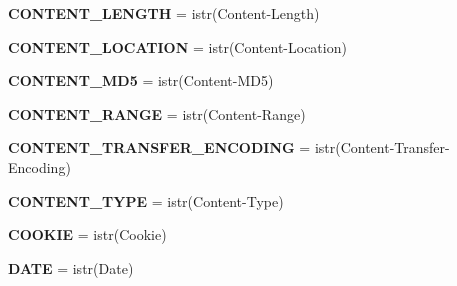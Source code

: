 \begin{DoxyCompactItemize}
\item 
\mbox{\label{namespaceaiohttp_1_1hdrs_a0021480f785966bab3a3574d0989e08b}} 
{\bfseries C\+O\+N\+T\+E\+N\+T\+\_\+\+L\+E\+N\+G\+TH} = istr(\textquotesingle{}Content-\/Length\textquotesingle{})
\item 
\mbox{\label{namespaceaiohttp_1_1hdrs_ac204b3a96d0adacc17ab5fe8728f4d96}} 
{\bfseries C\+O\+N\+T\+E\+N\+T\+\_\+\+L\+O\+C\+A\+T\+I\+ON} = istr(\textquotesingle{}Content-\/Location\textquotesingle{})
\item 
\mbox{\label{namespaceaiohttp_1_1hdrs_ae4d28606d96b4f916a6eabaaaaf8bbf7}} 
{\bfseries C\+O\+N\+T\+E\+N\+T\+\_\+\+M\+D5} = istr(\textquotesingle{}Content-\/M\+D5\textquotesingle{})
\item 
\mbox{\label{namespaceaiohttp_1_1hdrs_a98f44fc9ee6476abd7175b6b19e9c056}} 
{\bfseries C\+O\+N\+T\+E\+N\+T\+\_\+\+R\+A\+N\+GE} = istr(\textquotesingle{}Content-\/Range\textquotesingle{})
\item 
\mbox{\label{namespaceaiohttp_1_1hdrs_aab0ededa2cef1b6256274ac2c7037203}} 
{\bfseries C\+O\+N\+T\+E\+N\+T\+\_\+\+T\+R\+A\+N\+S\+F\+E\+R\+\_\+\+E\+N\+C\+O\+D\+I\+NG} = istr(\textquotesingle{}Content-\/Transfer-\/Encoding\textquotesingle{})
\item 
\mbox{\label{namespaceaiohttp_1_1hdrs_ad284d752d6863d550728c778bd1f883a}} 
{\bfseries C\+O\+N\+T\+E\+N\+T\+\_\+\+T\+Y\+PE} = istr(\textquotesingle{}Content-\/Type\textquotesingle{})
\item 
\mbox{\label{namespaceaiohttp_1_1hdrs_abe35de7ed8da4607e95787359b7e3977}} 
{\bfseries C\+O\+O\+K\+IE} = istr(\textquotesingle{}Cookie\textquotesingle{})
\item 
\mbox{\label{namespaceaiohttp_1_1hdrs_a63b15ad335daab6e01afe9f8d8610789}} 
{\bfseries D\+A\+TE} = istr(\textquotesingle{}Date\textquotesingle{})
\item 
\mbox{\label{namespaceaiohttp_1_1hdrs_a4dcf4cb9ecf56fe801c9f88086e4efc3}} 

\end{DoxyCompactItemize}
